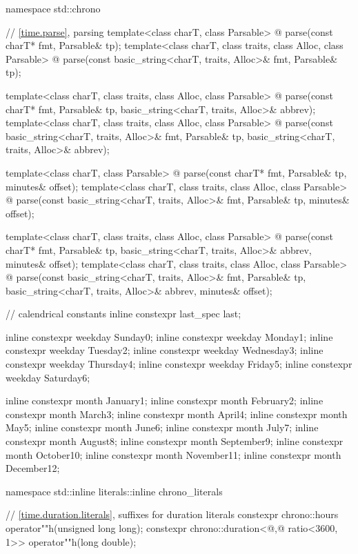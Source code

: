 \begin{codeblock}
namespace std::chrono {
  // \ref{time.parse}, parsing
  template<class charT, class Parsable>
    @\unspec@
     parse(const charT* fmt, Parsable& tp);
  template<class charT, class traits, class Alloc, class Parsable>
    @\unspec@
      parse(const basic_string<charT, traits, Alloc>& fmt, Parsable& tp);

  template<class charT, class traits, class Alloc, class Parsable>
    @\unspec@
      parse(const charT* fmt, Parsable& tp,
            basic_string<charT, traits, Alloc>& abbrev);
  template<class charT, class traits, class Alloc, class Parsable>
    @\unspec@
      parse(const basic_string<charT, traits, Alloc>& fmt, Parsable& tp,
            basic_string<charT, traits, Alloc>& abbrev);

  template<class charT, class Parsable>
    @\unspec@
      parse(const charT* fmt, Parsable& tp, minutes& offset);
  template<class charT, class traits, class Alloc, class Parsable>
    @\unspec@
      parse(const basic_string<charT, traits, Alloc>& fmt, Parsable& tp,
            minutes& offset);

  template<class charT, class traits, class Alloc, class Parsable>
    @\unspec@
      parse(const charT* fmt, Parsable& tp,
            basic_string<charT, traits, Alloc>& abbrev, minutes& offset);
  template<class charT, class traits, class Alloc, class Parsable>
    @\unspec@
      parse(const basic_string<charT, traits, Alloc>& fmt, Parsable& tp,
            basic_string<charT, traits, Alloc>& abbrev, minutes& offset);

  // calendrical constants
  inline constexpr last_spec last{};

  inline constexpr weekday Sunday{0};
  inline constexpr weekday Monday{1};
  inline constexpr weekday Tuesday{2};
  inline constexpr weekday Wednesday{3};
  inline constexpr weekday Thursday{4};
  inline constexpr weekday Friday{5};
  inline constexpr weekday Saturday{6};

  inline constexpr month January{1};
  inline constexpr month February{2};
  inline constexpr month March{3};
  inline constexpr month April{4};
  inline constexpr month May{5};
  inline constexpr month June{6};
  inline constexpr month July{7};
  inline constexpr month August{8};
  inline constexpr month September{9};
  inline constexpr month October{10};
  inline constexpr month November{11};
  inline constexpr month December{12};
}

namespace std::inline literals::inline chrono_literals {
  // \ref{time.duration.literals}, suffixes for duration literals
  constexpr chrono::hours                                 operator""h(unsigned long long);
  constexpr chrono::duration<@\unspec,@ ratio<3600, 1>> operator""h(long double);

}
\end{codeblock}
